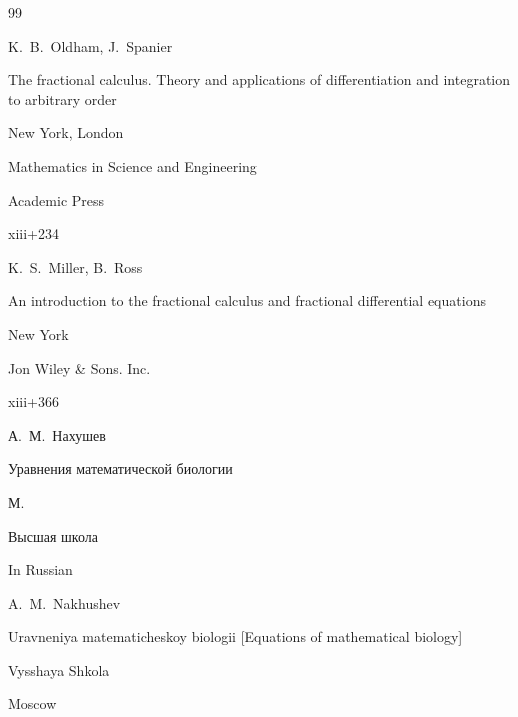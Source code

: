 \begin{thebibliography}{99}




\by K.~B.~Oldham, J.~Spanier

\book The fractional calculus. Theory and applications of differentiation and integration to arbitrary order

\publaddr  New York, London

\serial Mathematics in Science and Engineering


\publ Academic Press


\totalpages  xiii+234 





\by K.~S.~Miller, B.~Ross

\book An introduction to the fractional calculus and fractional differential equations

\publaddr New York

\publ Jon Wiley \& Sons. Inc.


\totalpages  xiii+366







\by А.~М.~Нахушев

\book Уравнения математической биологии

\publaddr М.

\publ Высшая школа




\misctransl

\lang In Russian

\by A.~M.~Nakhushev

\book Uravneniya matematicheskoy biologii \rm [Equations of mathematical biology]

\publ Vysshaya Shkola

\publaddr Moscow








\end{thebibliography}
